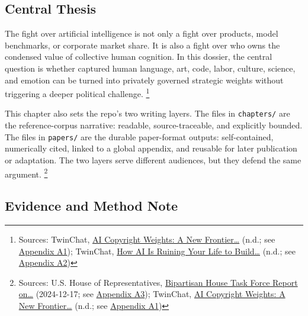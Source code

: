 \documentclass[
  american,
  11pt,
  letterpaper,
]{article}
\begin{document}
\subsection{Central Thesis}\label{central-thesis}

The fight over artificial intelligence is not only a fight over
products, model benchmarks, or corporate market share. It is also a
fight over who owns the condensed value of collective human cognition.
In this dossier, the central question is whether captured human
language, art, code, labor, culture, science, and emotion can be turned
into privately governed strategic weights without triggering a deeper
political challenge. \footnote{Sources: TwinChat,
  \href{https://medium.com/twinchat/ai-copyright-weights-a-new-frontier-in-intellectual-property-law-d8ee1b6c55ee}{AI
  Copyright Weights: A New Frontier\ldots{}} (n.d.; see
  \hyperref[appendix-a1-ai-copyright-weights-a-new-frontier-in-intellectual-property-law]{Appendix
  A1}); TwinChat,
  \href{https://medium.com/twinchat/how-ai-is-ruining-your-life-to-build-an-empire-8b6d02e55bc9}{How
  AI Is Ruining Your Life to Build\ldots{}} (n.d.; see
  \hyperref[appendix-a2-how-ai-is-ruining-your-life-to-build-an-empire]{Appendix
  A2})}

This chapter also sets the repo's two writing layers. The files in
\texttt{chapters/} are the reference-corpus narrative: readable,
source-traceable, and explicitly bounded. The files in \texttt{papers/}
are the durable paper-format outputs: self-contained, numerically cited,
linked to a global appendix, and reusable for later publication or
adaptation. The two layers serve different audiences, but they defend
the same argument. \footnote{Sources: U.S. House of Representatives,
  \href{https://www.speaker.gov/wp-content/uploads/2024/12/AI-Task-Force-Report-FINAL.pdf}{Bipartisan
  House Task Force Report on\ldots{}} (2024-12-17; see
  \hyperref[appendix-a3-bipartisan-house-task-force-report-on-artificial-intelligence]{Appendix
  A3}); TwinChat,
  \href{https://medium.com/twinchat/ai-copyright-weights-a-new-frontier-in-intellectual-property-law-d8ee1b6c55ee}{AI
  Copyright Weights: A New Frontier\ldots{}} (n.d.; see
  \hyperref[appendix-a1-ai-copyright-weights-a-new-frontier-in-intellectual-property-law]{Appendix
  A1})}

\subsection{Evidence and Method Note}\label{evidence-and-method-note}
\end{document}
